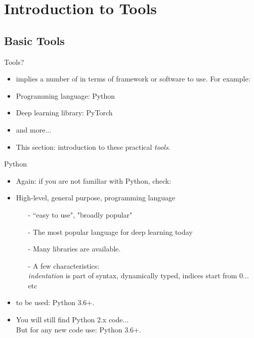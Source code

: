 \section{Introduction to Tools}
\subsection{Basic Tools}
\begin{frame}{Tools?}
\begin{itemize}
\item {} implies a number of  in terms of framework or software to use.
For example:
\item Programming language: Python
\item Deep learning library: PyTorch
\item and more...
\item This section: introduction to these practical \textit{tools}.
\end{itemize}
\end{frame}

\begin{frame}{Python}
\begin{itemize}
\item Again: if you are not familiar with Python, check: 
\item High-level, general purpose, programming language
\begin{itemize}
\item[-] ``easy to use", "broadly popular"
\item[-] The most popular language for deep learning today
\item[-] Many libraries are available.
\item[-] A few characteristics:\\ \textit{indentation} is part of syntax, dynamically typed, indices start from 0... etc
\end{itemize}
\item {} to be used: Python 3.6+.
\item You will still find Python 2.x code... \\
But for any new code use: Python 3.6+.
\end{itemize}
\end{frame}

